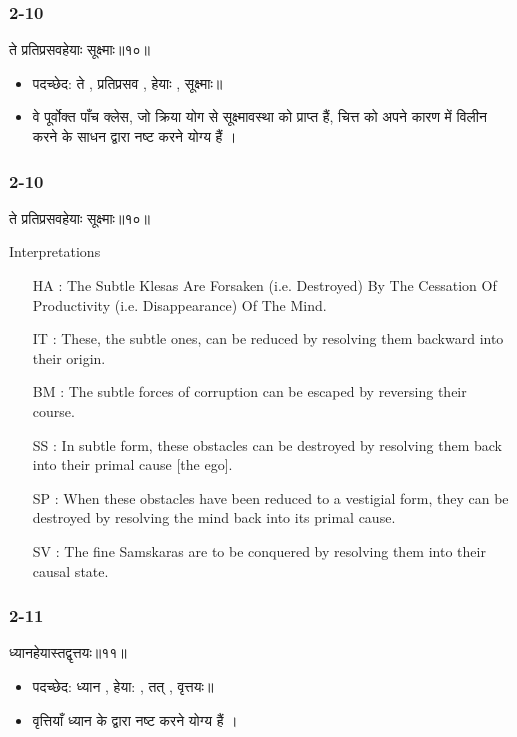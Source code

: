 \begin{frame}[fragile]\frametitle{2-10}
\begin{sanskrit}
ते प्रतिप्रसवहेयाः सूक्ष्माः॥१०॥
\end{sanskrit}

\begin{itemize}
\item पदच्छेद: ते , प्रतिप्रसव , हेयाः , सूक्ष्माः॥
\item वे पूर्वोक्त पाँच क्लेस, जो क्रिया योग से सूक्ष्मावस्था को प्राप्त हैं, चित्त को अपने कारण में विलीन करने के साधन द्वारा नष्ट करने योग्य हैं ।
\end{itemize}
	
\end{frame}


\begin{frame}[fragile]\frametitle{2-10}
\begin{sanskrit}
ते प्रतिप्रसवहेयाः सूक्ष्माः॥१०॥
\end{sanskrit}

Interpretations
\begin{itemize}
\item [HA]: The Subtle Klesas Are Forsaken (i.e. Destroyed) By The Cessation Of Productivity (i.e. Disappearance) Of The Mind.
\item [IT]: These, the subtle ones, can be reduced by resolving them backward into their origin.
\item [BM]: The subtle forces of corruption can be escaped by reversing their course.
\item [SS]: In subtle form, these obstacles can be destroyed by resolving them back into their primal cause [the ego].
\item [SP]: When these obstacles have been reduced to a vestigial form, they can be destroyed by resolving the mind back into its primal cause.
\item [SV]: The fine Samskaras are to be conquered by resolving them into their causal state. 
\end{itemize}
	
\end{frame}

\begin{frame}[fragile]\frametitle{2-11}
\begin{sanskrit}
ध्यानहेयास्तद्वृत्तयः॥११॥
\end{sanskrit}

\begin{itemize}
\item पदच्छेद: ध्यान , हेया: , तत् , वृत्तयः॥
\item वृत्तियाँ ध्यान के द्वारा नष्ट करने योग्य हैं ।
\end{itemize}
	
\end{frame}

